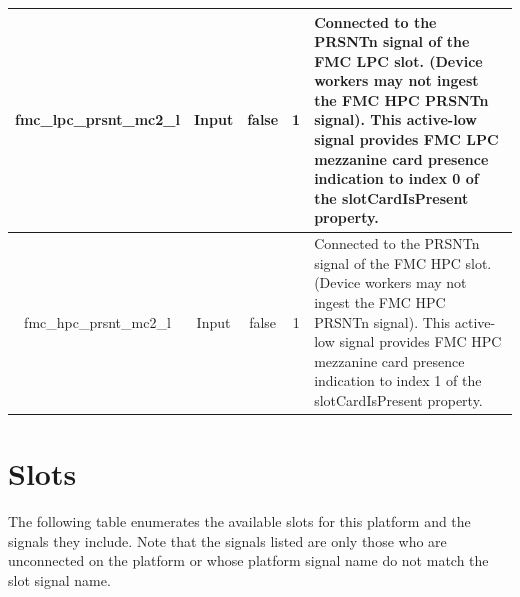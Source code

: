 \documentclass{article}
\begin{document}
\begin{tabular}{|c|c|c|c|p{8cm}|}
	\hline
	fmc\_lpc\_prsnt\_mc2\_l & Input & false & 1    & Connected to the PRSNTn signal of the FMC LPC slot. (Device workers may not ingest the FMC HPC PRSNTn signal). This active-low signal provides FMC LPC mezzanine card presence indication to index 0 of the slotCardIsPresent property.         \\
	\hline
	fmc\_hpc\_prsnt\_mc2\_l & Input & false & 1    & Connected to the PRSNTn signal of the FMC HPC slot. (Device workers may not ingest the FMC HPC PRSNTn signal). This active-low signal provides FMC HPC mezzanine card presence indication to index 1 of the slotCardIsPresent property. \\
	\hline
\end{tabular}
\pagebreak
\section*{Slots}
The following table enumerates the available slots for this platform and the signals they include. Note that the signals listed are only those who are unconnected on the platform or whose platform signal name do not match the slot signal name. \\
\end{document}
